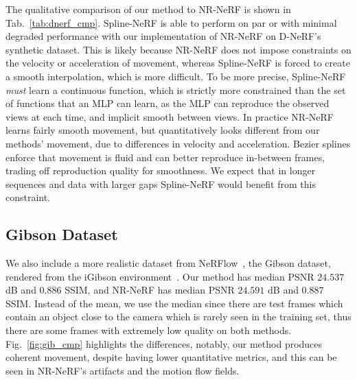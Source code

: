 The qualitative comparison of our method to NR-NeRF is shown in Tab.~\ref{tab:dnerf_cmp}. Spline-NeRF is able to perform on par or with minimal degraded performance with our implementation of NR-NeRF on D-NeRF's synthetic dataset. This is likely because NR-NeRF does not impose constraints on the velocity or acceleration of movement, whereas Spline-NeRF is forced to create a smooth interpolation, which is more difficult. To be more precise, Spline-NeRF \textit{must} learn a continuous function, which is strictly more constrained than the set of functions that an MLP can learn, as the MLP can reproduce the observed views at each time, and implicit smooth between views. In practice NR-NeRF learns fairly smooth movement, but quantitatively looks different from our methods' movement, due to differences in velocity and acceleration. Bezier splines enforce that movement is fluid and can better reproduce in-between frames, trading off reproduction quality for smoothness. We expect that in longer sequences and data with larger gaps Spline-NeRF would benefit from this constraint.

\subsection*{Gibson Dataset}

We also include a more realistic dataset from NeRFlow~\cite{du2021nerflow}, the Gibson dataset, rendered from the iGibson environment~\cite{xu2019DISN}. Our method has median PSNR $24.537$ dB and $0.886$ SSIM, and NR-NeRF has median PSNR $24.591$ dB and $0.887$ SSIM. Instead of the mean, we use the median since there are test frames which contain an object close to the camera which is rarely seen in the training set, thus there are some frames with extremely low quality on both methods. Fig.~\ref{fig:gib_cmp} highlights the differences, notably, our method produces coherent movement, despite having lower quantitative metrics, and this can be seen in NR-NeRF's artifacts and the motion flow fields.

